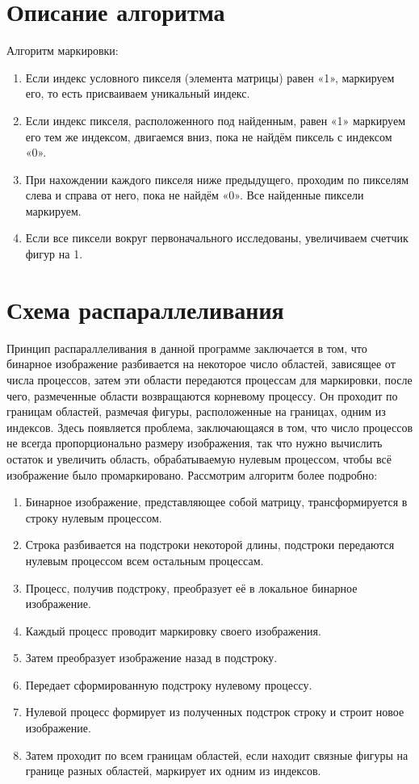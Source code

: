\documentclass{report}
\begin{document}
\section*{Описание алгоритма}
Алгоритм маркировки:
\begin{enumerate}
\item Если индекс условного пикселя (элемента матрицы) равен «1», маркируем его, то есть присваиваем уникальный индекс.
\item Если  индекс  пикселя, расположенного  под найденным, равен «1» маркируем его  тем же индексом, двигаемся вниз, пока не найдём  пиксель с индексом «0».
\item При нахождении каждого пикселя ниже предыдущего, проходим по пикселям слева и справа от него, пока не найдём «0». Все найденные пиксели маркируем. 
\item Если все пиксели вокруг первоначального исследованы, увеличиваем счетчик фигур на 1.
\end{enumerate}
\newpage

\section*{Схема распараллеливания}
Принцип распараллеливания в данной программе заключается в том, что бинарное изображение  разбивается  на  некоторое  число  областей,  зависящее  от  числа  процессов, затем  эти  области  передаются  процессам  для  маркировки,  после  чего,  размеченные области возвращаются корневому процессу. Он проходит по границам областей, размечая фигуры,  расположенные  на  границах,  одним  из  индексов.  Здесь  появляется  проблема, 
заключающаяся  в  том,  что  число  процессов  не  всегда  пропорционально  размеру изображения,  так  что  нужно  вычислить  остаток  и  увеличить  область,  обрабатываемую нулевым процессом, чтобы всё изображение было промаркировано. Рассмотрим алгоритм более подробно:
\begin{enumerate}
\item Бинарное изображение, представляющее собой матрицу, трансформируется в строку нулевым процессом.
\item Строка разбивается на подстроки некоторой длины, подстроки передаются нулевым процессом всем остальным процессам. 
\item Процесс, получив подстроку, преобразует её в локальное бинарное изображение.
\item Каждый процесс проводит маркировку своего изображения.
\item Затем преобразует изображение назад в подстроку.
\item Передает сформированную подстроку нулевому процессу. 
\item Нулевой  процесс  формирует  из  полученных  подстрок  строку  и  строит  новое изображение.
\item Затем проходит по всем границам областей, если находит связные фигуры на границе разных областей, маркирует их одним из индексов.
\end{enumerate}
\newpage
\end{document}
